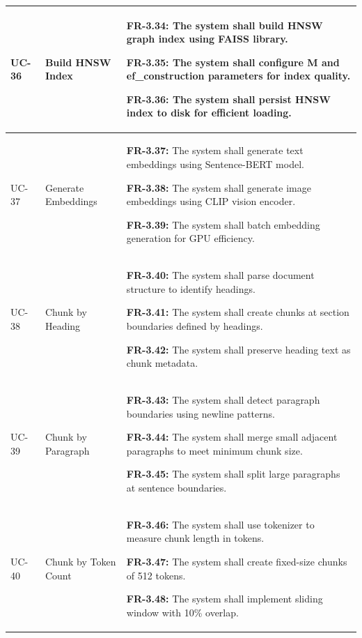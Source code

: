 \begin{longtable}{|>{\raggedright\arraybackslash}p{}|>{\raggedright\arraybackslash}p{}|>{\raggedright\arraybackslash}p{}|}
UC-36 & Build HNSW Index &
\begin{frequirements}
\item \textbf{FR-3.34:} The system shall build HNSW graph index using FAISS library.
\item \textbf{FR-3.35:} The system shall configure M and ef\_construction parameters for index quality.
\item \textbf{FR-3.36:} The system shall persist HNSW index to disk for efficient loading.
\end{frequirements} \\
\hline

UC-37 & Generate Embeddings &
\begin{frequirements}
\item \textbf{FR-3.37:} The system shall generate text embeddings using Sentence-BERT model.
\item \textbf{FR-3.38:} The system shall generate image embeddings using CLIP vision encoder.
\item \textbf{FR-3.39:} The system shall batch embedding generation for GPU efficiency.
\end{frequirements} \\
\hline

UC-38 & Chunk by Heading &
\begin{frequirements}
\item \textbf{FR-3.40:} The system shall parse document structure to identify headings.
\item \textbf{FR-3.41:} The system shall create chunks at section boundaries defined by headings.
\item \textbf{FR-3.42:} The system shall preserve heading text as chunk metadata.
\end{frequirements} \\
\hline

UC-39 & Chunk by Paragraph &
\begin{frequirements}
\item \textbf{FR-3.43:} The system shall detect paragraph boundaries using newline patterns.
\item \textbf{FR-3.44:} The system shall merge small adjacent paragraphs to meet minimum chunk size.
\item \textbf{FR-3.45:} The system shall split large paragraphs at sentence boundaries.
\end{frequirements} \\
\hline

UC-40 & Chunk by Token Count &
\begin{frequirements}
\item \textbf{FR-3.46:} The system shall use tokenizer to measure chunk length in tokens.
\item \textbf{FR-3.47:} The system shall create fixed-size chunks of 512 tokens.
\item \textbf{FR-3.48:} The system shall implement sliding window with 10\% overlap.
\end{frequirements} \\
\hline


\end{longtable}
